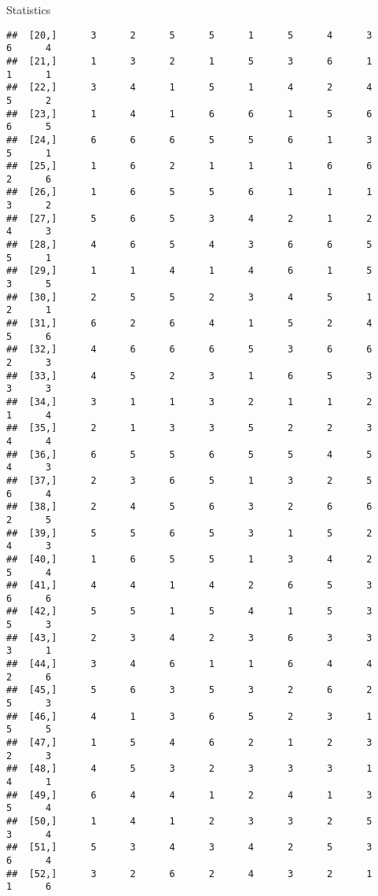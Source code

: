 \documentclass[
  ignorenonframetext,
]{beamer}
\begin{document}
\begin{frame}[fragile]{Statistics}
\begin{verbatim}
##  [20,]      3      2      5      5      1      5      4      3      6      4
##  [21,]      1      3      2      1      5      3      6      1      1      1
##  [22,]      3      4      1      5      1      4      2      4      5      2
##  [23,]      1      4      1      6      6      1      5      6      6      5
##  [24,]      6      6      6      5      5      6      1      3      5      1
##  [25,]      1      6      2      1      1      1      6      6      2      6
##  [26,]      1      6      5      5      6      1      1      1      3      2
##  [27,]      5      6      5      3      4      2      1      2      4      3
##  [28,]      4      6      5      4      3      6      6      5      5      1
##  [29,]      1      1      4      1      4      6      1      5      3      5
##  [30,]      2      5      5      2      3      4      5      1      2      1
##  [31,]      6      2      6      4      1      5      2      4      5      6
##  [32,]      4      6      6      6      5      3      6      6      2      3
##  [33,]      4      5      2      3      1      6      5      3      3      3
##  [34,]      3      1      1      3      2      1      1      2      1      4
##  [35,]      2      1      3      3      5      2      2      3      4      4
##  [36,]      6      5      5      6      5      5      4      5      4      3
##  [37,]      2      3      6      5      1      3      2      5      6      4
##  [38,]      2      4      5      6      3      2      6      6      2      5
##  [39,]      5      5      6      5      3      1      5      2      4      3
##  [40,]      1      6      5      5      1      3      4      2      5      4
##  [41,]      4      4      1      4      2      6      5      3      6      6
##  [42,]      5      5      1      5      4      1      5      3      5      3
##  [43,]      2      3      4      2      3      6      3      3      3      1
##  [44,]      3      4      6      1      1      6      4      4      2      6
##  [45,]      5      6      3      5      3      2      6      2      5      3
##  [46,]      4      1      3      6      5      2      3      1      5      5
##  [47,]      1      5      4      6      2      1      2      3      2      3
##  [48,]      4      5      3      2      3      3      3      1      4      1
##  [49,]      6      4      4      1      2      4      1      3      5      4
##  [50,]      1      4      1      2      3      3      2      5      3      4
##  [51,]      5      3      4      3      4      2      5      3      6      4
##  [52,]      3      2      6      2      4      3      2      1      1      6

\end{verbatim}
\end{frame}
\end{document}
